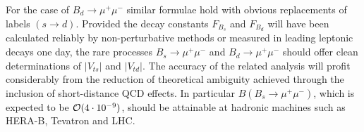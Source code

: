 For the case of $B_d\to\mu^+\mu^-$ similar formulae hold with obvious
replacements of labels $(s\to d)$. Provided the decay constants
$F_{B_s}$ and $F_{B_d}$ will have been calculated reliably by
non-perturbative methods or measured in leading leptonic decays one
day, the rare processes $B_{s}\to\mu^+\mu^-$ and $B_{d}\to\mu^+\mu^-$
should offer clean determinations of $|V_{ts}|$ and $|V_{td}|$. The
accuracy of the related analysis will profit considerably from the
reduction of theoretical ambiguity achieved through the inclusion of
short-distance QCD effects. In particular $B(B_s\to\mu^+\mu^-)$, which
is expected to be ${\cal O}(4\cdot 10^{-9})$, should be attainable at 
hadronic machines such as HERA-B, Tevatron and LHC.
